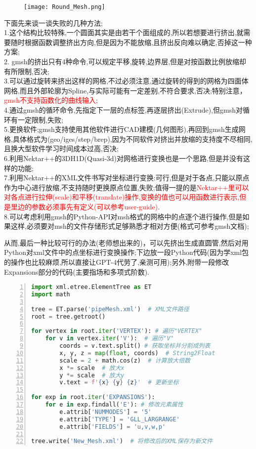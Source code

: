 \begin{figure}[h]
	\noindent
	\centering
	\texttt{[image: Round\_Mesh.png]}
\end{figure}
\noindent
下面先来谈一谈失败的几种方法;\\
1.这个结构比较特殊,一个圆面其实是由若干个面组成的,所以若想要进行挤出,就需要随时根据函数调整挤出方向,但是因为不能放缩,且挤出反向难以确定,否掉这一种方案;\\
2. gmsh的挤出只有4种命令,可以规定平移,旋转,边界层,但是对按函数比例放缩却有所限制,否决;\\
3.可以通过旋转来挤出这样的网格,不过必须注意,通过旋转的得到的网格为四面体网格,而且外部轮廓为Spline,与实际可能有一定差别,不符合要求,否决;特别注意，\textcolor{red}{gmsh不支持函数化的曲线输入};\\
4.通过gmsh的循环命令,先指定下一层的点标签,再逐层挤出(Extrude),但gmsh对循环有一定限制,失败;\\
5.更换软件;gmsh支持使用其他软件进行CAD建模(几何图形),再回到gmsh生成网格,具体格式为(geo/iges/step/brep),因为不同软件对挤出并放缩的支持度不尽相同,且换大型软件学习时间成本过高,否决;\\
6.利用Nektar++的3DH1D(Quasi-3d)对网格进行变换也是一个思路,但是并没有这样的功能;\\
7.利用Nektar++的XML文件书写对坐标进行变换:可行,但是对于各点,只能以原点作为中心进行放缩,不支持随时更换原点位置,失败;值得一提的是\textcolor{red}{Nektar++里可以对各点进行拉伸(scale)和平移(translate)操作,变换的值也可以用函数进行表示,但是里边的参数必须事先有定义(可以参考user-guide)}.\\
8.可以考虑利用gmsh的Python-API对msh格式的网格中的点逐个进行操作,但是如果这样,必须要对msh的文件存储形式足够熟悉才相对方便(格式可参考gmsh文档);\par

从而,最后一种比较可行的办法(老师想出来的)，可以先挤出生成直圆管,然后对用Python对xml文件中的点坐标进行变换操作;下边放一段Python代码(因为学xml包的操作也比较麻烦,所以直接让GPT-4代劳了,亲测可用);另外,附带一段修改Expansions部分的代码(主要指场和多项式阶数).

\begin{lstlisting}[numbers=left,frame=single,language=Python]
import xml.etree.ElementTree as ET
import math

tree = ET.parse('pipeMesh.xml')  # XML文件路径
root = tree.getroot()

for vertex in root.iter('VERTEX'): # 遍历"VERTEX"
	for v in vertex.iter('V'):  # 遍历"V"
		coords = v.text.split() # 获取坐标并分割成列表
		x, y, z = map(float, coords)  # String2Float
		scale = 2 + math.cos(z)  # 计算放大倍数
		x *= scale  # 放大x
		y *= scale  # 放大y
		v.text = f'{x} {y} {z}'  # 更新坐标

for exp in root.iter('EXPANSIONS'):
	for e in exp.findall('E'): # 修改元素属性
		e.attrib['NUMMODES'] = '5'
		e.attrib['TYPE'] = 'GLL_LARGRANGE'
		e.attrib['FIELDS'] = 'u,v,w,p'

tree.write('New_Mesh.xml')  # 将修改后的XML保存为新文件
\end{lstlisting}
\par

